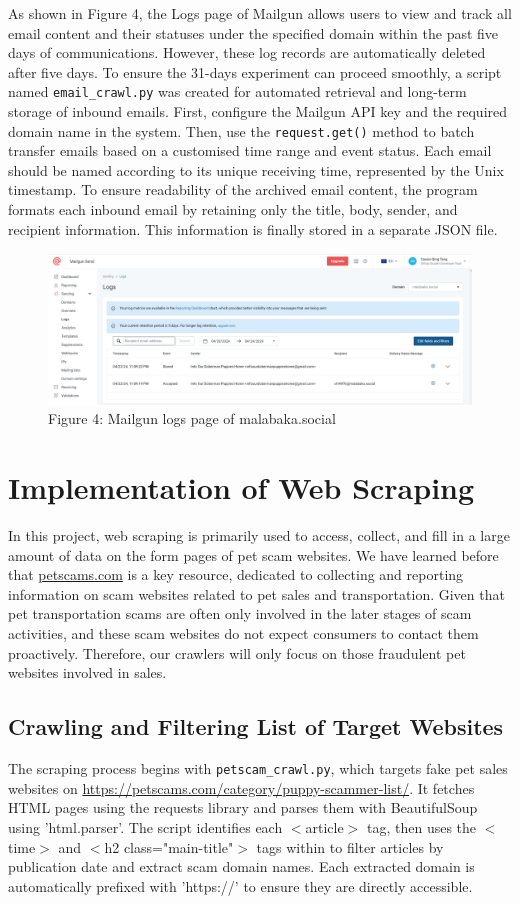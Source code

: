 \documentclass[ oneside,%
                    author={Cassie Qing Tang},
                    degree={BSc},
                     title={An Automated Response System for Disrupting Online Pet Scamming \\ },
                    subtitle={ }]{dissertation}
\begin{document}
As shown in Figure 4, the Logs page of Mailgun allows users to view and track all email content and their statuses under the specified domain within the past five days of communications. However, these log records are automatically deleted after five days. To ensure the 31-days experiment can proceed smoothly, a script named \texttt{email\_crawl.py} was created for automated retrieval and long-term storage of inbound emails. First, configure the Mailgun API key and the required domain name in the system. Then, use the \texttt{request.get()} method to batch transfer emails based on a customised time range and event status. Each email should be named according to its unique receiving time, represented by the Unix timestamp. To ensure readability of the archived email content, the program formats each inbound email by retaining only the title, body, sender, and recipient information. This information is finally stored in a separate JSON file.
\begin{figure}[H]
\centering
\includegraphics[width=0.85\linewidth,height=0.2\textheight]{pic/figure4.png}
\caption{Figure 4: Mailgun logs page of malabaka.social}
\end{figure}


\section{Implementation of Web Scraping}
In this project, web scraping is primarily used to access, collect, and fill in a large amount of data on the form pages of pet scam websites. We have learned before that \href{www.petscams.com}{petscams.com} is a key resource, dedicated to collecting and reporting information on scam websites related to pet sales and transportation. Given that pet transportation scams are often only involved in the later stages of scam activities, and these scam websites do not expect consumers to contact them proactively. Therefore, our crawlers will only focus on those fraudulent pet websites involved in sales.

\subsection{Crawling and Filtering List of Target Websites}
The scraping process begins with \texttt{petscam\_crawl.py}, which targets fake pet sales websites on \url{https://petscams.com/category/puppy-scammer-list/}. It fetches HTML pages using the requests library and parses them with BeautifulSoup using 'html.parser'. The script identifies each $<$article$>$ tag, then uses the $<$time$>$ and $<$h2 class="main-title"$>$ tags within to filter articles by publication date and extract scam domain names.  Each extracted domain is automatically prefixed with 'https://' to ensure they are directly accessible.
\\
\end{document}
